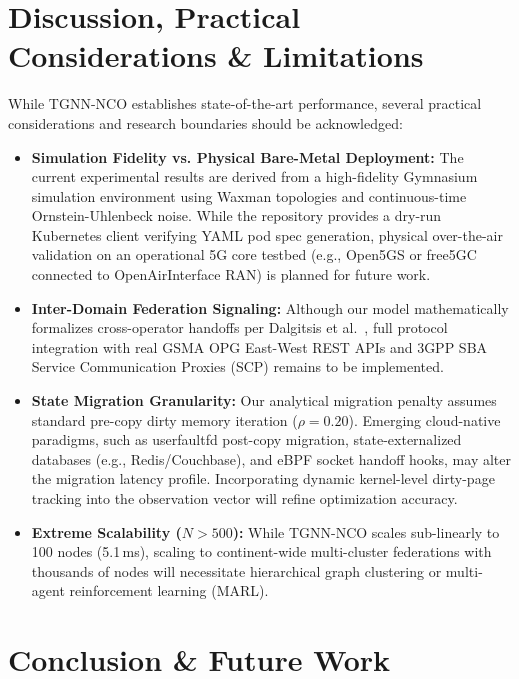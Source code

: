 \documentclass[conference]{IEEEtran}
\begin{document}
\section{Discussion, Practical Considerations \& Limitations}
\label{sec:discussion}

While TGNN-NCO establishes state-of-the-art performance, several practical considerations and research boundaries should be acknowledged:

\begin{itemize}
    \item \textbf{Simulation Fidelity vs. Physical Bare-Metal Deployment:} The current experimental results are derived from a high-fidelity Gymnasium simulation environment using Waxman topologies and continuous-time Ornstein-Uhlenbeck noise. While the repository provides a dry-run Kubernetes client verifying YAML pod spec generation, physical over-the-air validation on an operational 5G core testbed (e.g., Open5GS or free5GC connected to OpenAirInterface RAN) is planned for future work.
    \item \textbf{Inter-Domain Federation Signaling:} Although our model mathematically formalizes cross-operator handoffs per Dalgitsis et al.~\cite{dalgitsis2024federation}, full protocol integration with real GSMA OPG East-West REST APIs and 3GPP SBA Service Communication Proxies (SCP) remains to be implemented.
    \item \textbf{State Migration Granularity:} Our analytical migration penalty assumes standard pre-copy dirty memory iteration ($\rho=0.20$). Emerging cloud-native paradigms, such as userfaultfd post-copy migration, state-externalized databases (e.g., Redis/Couchbase), and eBPF socket handoff hooks, may alter the migration latency profile. Incorporating dynamic kernel-level dirty-page tracking into the observation vector will refine optimization accuracy.
    \item \textbf{Extreme Scalability ($N > 500$):} While TGNN-NCO scales sub-linearly to 100 nodes (5.1\,ms), scaling to continent-wide multi-cluster federations with thousands of nodes will necessitate hierarchical graph clustering or multi-agent reinforcement learning (MARL).
\end{itemize}

\section{Conclusion \& Future Work}
\label{sec:conclusion}
\end{document}
